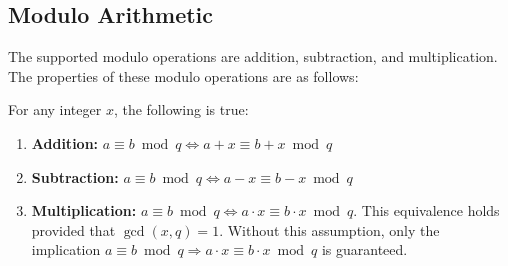\subsection{Modulo Arithmetic}
\label{subsec:modulo-arithmetic}

The supported modulo operations are addition, subtraction, and multiplication. The properties of these modulo operations are as follows:

\begin{tcolorbox}[title={\textbf{\tboxtheorem{\ref*{subsec:modulo-arithmetic}.1} Properties of Modulo Operations}}]
For any integer $x$, the following is true:

\begin{enumerate}
\item \textbf{Addition:} $a \equiv b \bmod q \Longleftrightarrow a + x\equiv b + x\bmod q$

\item \textbf{Subtraction:} $a \equiv b \bmod q \Longleftrightarrow a - x\equiv b - x\bmod q$

\item \textbf{Multiplication:} $a \equiv b \bmod q \Longleftrightarrow a \cdot x \equiv b \cdot x \bmod q$. 
This equivalence holds provided that $\gcd(x,q)=1$. Without this assumption, only the implication $a \equiv b \bmod q \Rightarrow a \cdot x \equiv b \cdot x \bmod q$ is guaranteed.

\end{enumerate}

\end{tcolorbox}

